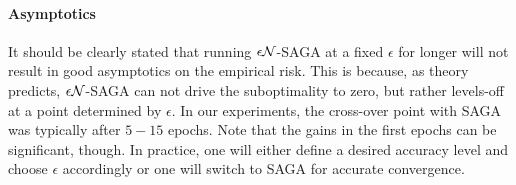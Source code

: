 \vspace{-1.3mm}
\paragraph{Asymptotics} It should be clearly stated that running $\epsilon{\cal N}$-SAGA at a fixed $\epsilon$ for longer will not result in good  asymptotics on the empirical risk. This is because, as theory predicts, $\epsilon{\cal N}$-SAGA can not drive the suboptimality to zero, but rather levels-off at a point determined by $\epsilon$. In our experiments, the cross-over point with SAGA was typically after $5-15$ epochs. Note that the gains in the first epochs can be significant, though. In practice, one will either define a desired accuracy level and choose $\epsilon$ accordingly or one will switch to SAGA for accurate convergence. 
\vspace{-1mm}
